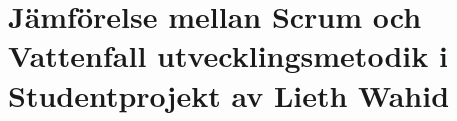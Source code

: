 \chapter{Jämförelse mellan Scrum och Vattenfall utvecklingsmetodik i Studentprojekt  av Lieth Wahid}
\label{individual:lieth-wahid}







